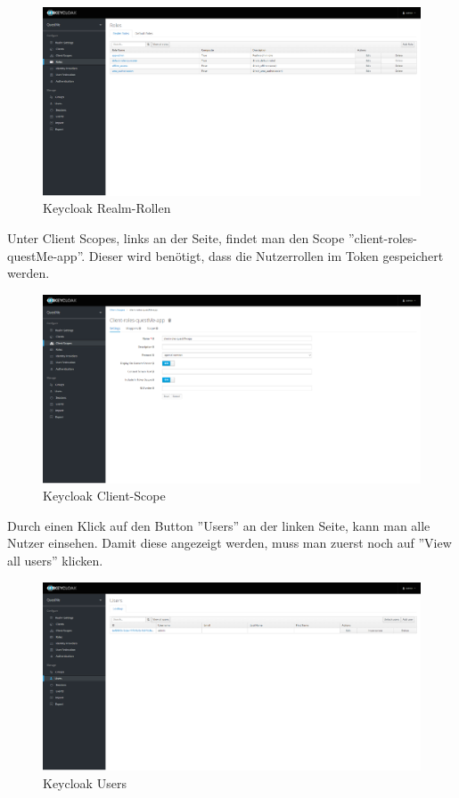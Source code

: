 \begin{figure}[H]
    \centering
    \includegraphics[width=1.0\textwidth]{bilder/administrationshandbuch/keycloak_realm_roles.png}
    \caption{Keycloak Realm-Rollen}
    \label{fig:Keycloak_Realm_Rollen}
\end{figure}

\noindent Unter Client Scopes, links an der Seite, findet man den Scope ''client-roles-questMe-app''. 
Dieser wird benötigt, dass die Nutzerrollen im Token gespeichert werden.

\begin{figure}[H]
    \centering
    \includegraphics[width=1.0\textwidth]{bilder/administrationshandbuch/keycloak_client_scope.png}
    \caption{Keycloak Client-Scope}
    \label{fig:Keycloak_Client_Scope}
\end{figure}

\noindent Durch einen Klick auf den Button ''Users'' an der linken Seite, kann man alle Nutzer einsehen. 
Damit diese angezeigt werden, muss man zuerst noch auf ''View all users'' klicken.

\begin{figure}[H]
    \centering
    \includegraphics[width=1.0\textwidth]{bilder/administrationshandbuch/keycloak_users.png}
    \caption{Keycloak Users}
    \label{fig:Keycloak_Users}
\end{figure}

